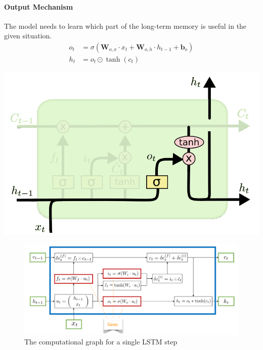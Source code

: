 \documentclass[11pt]{article}
\begin{document}
\vspace{1em}
\noindent
\begin{minipage}{0.7\linewidth}
	\paragraph{Output Mechanism} The model needs to learn which part of the long-term memory is useful in the given situation.
	\begin{align*}
	o_t &= \sigma(\textbf{W}_{o,x}\cdot x_t + \textbf{W}_{o,h}\cdot h_{t-1} + \textbf{b}_o)\\
	h_t &= o_t\odot\tanh(c_t)
	\end{align*}
\end{minipage}
\qquad
\begin{minipage}{0.2\linewidth}
\begin{center}
	\includegraphics[width=\linewidth]{img/LSTM_unit_output_mechanism}
\end{center}
\end{minipage}

\begin{figure}[H]
	\centering
	\includegraphics[width=0.8\linewidth]{img/LSTM_step_graph}
	\caption{The computational graph for a single LSTM step}
	\label{fig:lstmstepgraph}
\end{figure}
\end{document}
